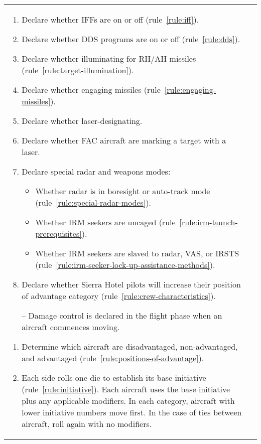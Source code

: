 \begin{twocolumntable}
\begin{tabularx}{1.0\linewidth}{L@{\hspace{\columnsep}}L}
{\begin{enumerate}[topsep=0pt]
\begin{enumerate}[nosep]
    \item Declare whether IFFs are on or off (rule~\ref{rule:iff}).
    \item Declare whether DDS programs are on or off (rule~\ref{rule:dds}).
    \item Declare whether illuminating for RH/AH missiles (rule~\ref{rule:target-illumination}).
    \item Declare whether engaging missiles (rule~\ref{rule:engaging-missiles}).
    \item Declare whether laser-designating.
    \item Declare whether FAC aircraft are marking a target with a laser.
    \item Declare special radar and weapons modes:
    \begin{itemize}
        \item Whether radar is in boresight or auto-track mode (rule~\ref{rule:special-radar-modes}).
        \item Whether IRM seekers are uncaged (rule~\ref{rule:irm-launch-prerequisites}).
        \item Whether IRM seekers are slaved to radar, VAS, or IRSTS (rule~\ref{rule:irm-seeker-lock-up-assistance-methods}).
    \end{itemize}
    \item Declare whether Sierra Hotel pilots will increase their position of advantage category (rule~\ref{rule:crew-characteristics}).
    \item[--] Damage control is declared in the flight phase when an aircraft commences moving.
\end{enumerate}


\begin{enumerate}[nosep]
    \item Determine which aircraft are disadvantaged, non-advantaged, and advantaged (rule~\ref{rule:positions-of-advantage}).
    \item Each side rolls one die to establish its base initiative (rule~\ref{rule:initiative}). Each aircraft uses the base initiative plus any applicable modifiers. In each category, aircraft with lower initiative numbers move first. In the case of ties between aircraft, roll again with no modifiers.
\end{enumerate}

\end{enumerate}

}
\end{tabularx}
\end{twocolumntable}
